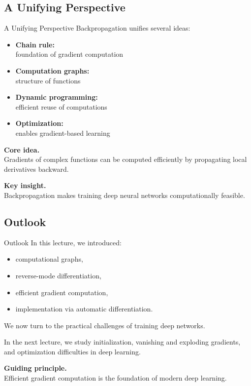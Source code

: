 \documentclass[aspectratio=169,11pt]{beamer}
\begin{document}
\subsection{A Unifying Perspective}
\begin{frame}[t,allowframebreaks]{A Unifying Perspective}
\small
Backpropagation unifies several ideas:

\begin{itemize}
    \item \textbf{Chain rule:}\\ foundation of gradient computation
    \item \textbf{Computation graphs:}\\ structure of functions
    \item \textbf{Dynamic programming:}\\ efficient reuse of computations
    \item \textbf{Optimization:}\\ enables gradient-based learning
\end{itemize}

\textbf{Core idea.}\\ Gradients of complex functions can be computed efficiently by propagating local derivatives backward.

\textbf{Key insight.}\\ Backpropagation makes training deep neural networks computationally feasible.
\end{frame}

\subsection{Outlook}
\begin{frame}[t,allowframebreaks]{Outlook}
\small
In this lecture, we introduced:

\begin{itemize}
    \item computational graphs,
    \item reverse-mode differentiation,
    \item efficient gradient computation,
    \item implementation via automatic differentiation.
\end{itemize}

We now turn to the practical challenges of training deep networks.

In the next lecture, we study initialization, vanishing and exploding gradients, and optimization difficulties in deep learning.

\textbf{Guiding principle.}\\ Efficient gradient computation is the foundation of modern deep learning.
\end{frame}
\end{document}
